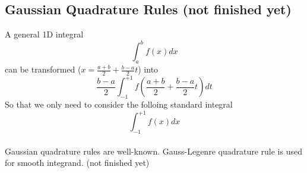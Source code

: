 \documentclass [10pt,letterpaper]{article}
\begin{document}
\subsection{Gaussian Quadrature Rules (not finished yet)}
\label{subsec:gaussian-quadrature-rules}
A general 1D integral
\begin{equation} \label{eq:general-1D-integral-dx}
	\int \nolimits_{a}^{b}
	f(x)
	dx
\end{equation}
can be transformed ($x= \frac{a+b}{2} + \frac{b-a}{2} t$) into 
\begin{equation}  \label{eq:general-1D-integral-dt} 
	\frac{b-a}{2}
	\int \nolimits_{-1}^{+1} 
	f(
		\frac{a+b}{2} 
		+
		\frac{b-a}{2}
		t
	)
	dt
\end{equation}
So that we only need to consider the folloing standard integral
\begin{equation} \label{eq:standard-1D-integral-dx}
	\int \nolimits_{-1}^{+1}
	f(x)
	dx 
\end{equation}
\\
Gaussian quadrature rules are well-known.
Gauss-Legenre quadrature rule is used for smooth integrand.
(not finished yet)
\end{document}
